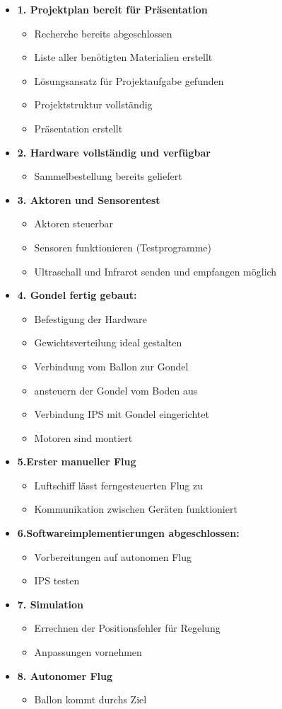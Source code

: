 \documentclass[lang=ngerman,inputenc=utf8,fontsize=10pt]{ldvarticle}
\begin{document}
\begin{itemize}
\item \textbf{1. Projektplan bereit für Präsentation}
\begin{itemize}
\item Recherche bereits abgeschlossen
\item Liste aller benötigten Materialien erstellt
\item Lösungsansatz für Projektaufgabe gefunden
\item Projektstruktur vollständig
\item Präsentation erstellt
\end{itemize}
\item \textbf{2. Hardware vollständig und verfügbar}
\begin{itemize}
\item Sammelbestellung bereits geliefert
\end{itemize}
\item \textbf{3. Aktoren und Sensorentest}
\begin{itemize}
\item Aktoren steuerbar
\item Sensoren funktionieren (Testprogramme)
\item Ultraschall und Infrarot senden und empfangen möglich
\end{itemize}
\item \textbf{4. Gondel fertig gebaut:}
\begin{itemize}
\item Befestigung der Hardware
\item Gewichtsverteilung ideal gestalten
\item Verbindung vom Ballon zur Gondel
\item ansteuern der Gondel vom Boden aus
\item Verbindung IPS mit Gondel eingerichtet
\item Motoren sind montiert
\end{itemize}
\item \textbf{5.Erster manueller Flug}
\begin{itemize}
\item Luftschiff lässt ferngesteuerten Flug zu
\item Kommunikation zwischen Geräten funktioniert
\end{itemize}
\item \textbf{6.Softwareimplementierungen abgeschlossen:}
\begin{itemize}
\item Vorbereitungen auf autonomen Flug
\item IPS testen
\end{itemize}
\item \textbf{7. Simulation}
\begin{itemize}
\item Errechnen der Positionsfehler für Regelung
\item Anpassungen vornehmen
\end{itemize}
\item \textbf{8. Autonomer Flug}
\begin{itemize}
\item Ballon kommt durchs Ziel


\end{itemize}
\end{itemize}
\end{document}
